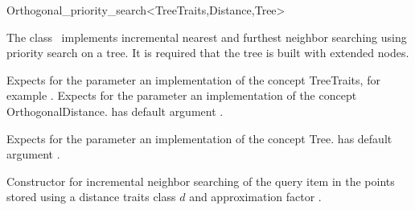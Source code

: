 

\begin{ccRefClass}{Orthogonal_priority_search<TreeTraits,Distance,Tree>}  %


\ccDefinition

The class \ccRefName\ implements incremental nearest and furthest neighbor searching
using priority search on a tree. It is required that the tree is
built with extended nodes.


\ccParameters

Expects for the parameter  an implementation of the concept TreeTraits,
for example .
Expects for the parameter  an implementation of the
concept OrthogonalDistance.  has default argument 
.

Expects for the parameter  an implementation of the concept Tree.
 has default argument .

\ccTypes


\ccCreation
{}  %

{Constructor for incremental neighbor searching of the query item 
in the points stored  using a distance
traits class $d$ and approximation factor .}


\end{ccRefClass}

